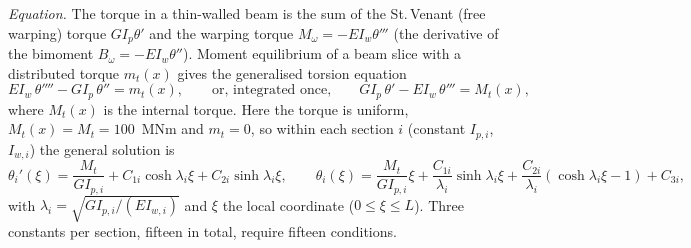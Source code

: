 \bigskip
\emph{Equation.} The torque in a thin-walled beam is the sum of the St.\,Venant (free warping) torque $GI_p\theta'$ and the warping torque $M_\omega=-EI_w\theta'''$ (the derivative of the bimoment $B_\omega=-EI_w\theta''$). Moment equilibrium of a beam slice with a distributed torque $m_t(x)$ gives the generalised torsion equation
\begin{equation}
  EI_w\,\theta''''-GI_p\,\theta''=m_t(x),\qquad\text{or, integrated once,}\qquad GI_p\,\theta'-EI_w\,\theta'''=M_t(x),
  \label{eq:gte}
\end{equation}
where $M_t(x)$ is the internal torque. Here the torque is uniform, $M_t(x)=M_t=100$~MNm and $m_t=0$, so within each section $i$ (constant $I_{p,i}$, $I_{w,i}$) the general solution is
\begin{equation}
  \theta_i'(\xi)=\frac{M_t}{GI_{p,i}}+C_{1i}\cosh\lambda_i\xi+C_{2i}\sinh\lambda_i\xi,\qquad
  \theta_i(\xi)=\frac{M_t}{GI_{p,i}}\xi+\frac{C_{1i}}{\lambda_i}\sinh\lambda_i\xi+\frac{C_{2i}}{\lambda_i}(\cosh\lambda_i\xi-1)+C_{3i},
  \label{eq:gensol}
\end{equation}
with $\lambda_i=\sqrt{GI_{p,i}/(EI_{w,i})}$ and $\xi$ the local coordinate ($0\le\xi\le L$). Three constants per section, fifteen in total, require fifteen conditions.

